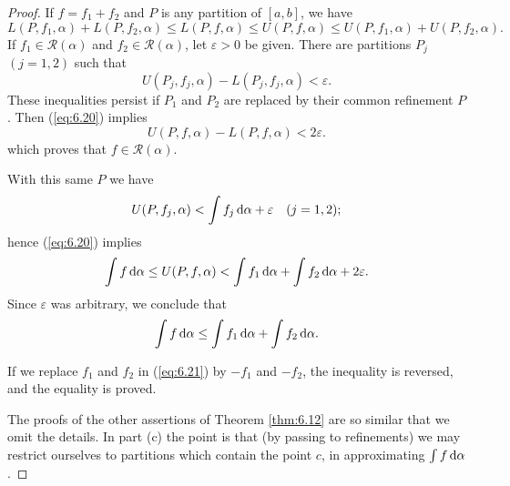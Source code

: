 \begin{proof}
    If $f = f_1 + f_2$ and $P$ is any partition of $[a, b]$, we have
    \begin{equation}
        \label{eq:6.20}
        L(P, f_1, \alpha) + 
        L(P, f_2, \alpha) \leq
        L(P, f, \alpha) \leq
        U(P, f, \alpha) \leq
        U(P, f_1, \alpha) +
        U(P, f_2, \alpha) .
    \end{equation}
    If $f_1 \in \mathscr{R}(\alpha)$ and $f_2 \in \mathscr{R}(\alpha)$, 
    let $\varepsilon > 0$ be given.
    There are partitions $P_j$ $(j = 1, 2)$ such that 
    \begin{equation*}
        U(P_j, f_j, \alpha) -
        L(P_j, f_j, \alpha) < \varepsilon .
    \end{equation*}
    These inequalities persist if $P_1$ and $P_2$ are replaced by their common refinement $P$. Then (\ref{eq:6.20}) implies 
    \begin{equation*}
        U(P, f, \alpha) -
        L(P, f, \alpha) < 2 \varepsilon .
    \end{equation*}
    which proves that $f \in \mathscr{R}(\alpha)$.

    With this same $P$ we have 
    \begin{equation*}
        U(P, f_j, \alpha) <
        \int f_j \d \alpha + \varepsilon
        \quad (j = 1, 2);
    \end{equation*}
    hence (\ref{eq:6.20}) implies
    \begin{equation*}
        \int f \d \alpha \leq
        U(P, f, \alpha) <
        \int f_1 \d \alpha +
        \int f_2 \d \alpha +
        2 \varepsilon.
    \end{equation*}
    Since $\varepsilon$ was arbitrary, we conclude that 
    \begin{equation}
        \label{eq:6.21}
        \int f \d \alpha \leq
        \int f_1 \d \alpha +
        \int f_2 \d \alpha .
    \end{equation}

    If we replace $f_1$ and $f_2$ in (\ref{eq:6.21}) by $-f_1$ and $-f_2$, the inequality is reversed, and the equality is proved.
    
    The proofs of the other assertions of Theorem \ref{thm:6.12} are so similar that we omit the details. 
    In part (c) the point is that (by passing to refinements) 
    we may restrict ourselves to partitions which contain the point $c$,
    in approximating $\int f \d \alpha$.
\end{proof}

